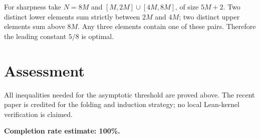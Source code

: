 \documentclass[11pt]{article}
\begin{document}
For sharpness take $N=8M$ and $[M,2M]\cup[4M,8M]$, of size $5M+2$. Two distinct lower elements sum strictly between $2M$ and $4M$; two distinct upper elements sum above $8M$. Any three elements contain one of these pairs. Therefore the leading constant $5/8$ is optimal.

\section*{Assessment}
All inequalities needed for the asymptotic threshold are proved above. The recent paper is credited for the folding and induction strategy; no local Lean-kernel verification is claimed.

\textbf{Completion rate estimate: 100\%.}
\end{document}
